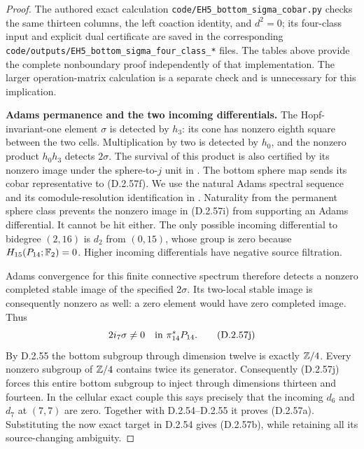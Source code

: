 \begin{proof}
The authored exact calculation
\texttt{code/EH5\_bottom\_sigma\_cobar.py} checks
the same thirteen columns, the left coaction identity,
and $d^2=0$; its four-class input and explicit dual
certificate are saved in the corresponding
\texttt{code/outputs/EH5\_bottom\_sigma\_four\_class\_*}
files.  The tables above provide the complete
nonboundary proof independently of that implementation.
The larger operation-matrix calculation is a separate
check and is unnecessary for this implication.

\medskip\noindent
\textbf{Adams permanence and the two incoming differentials.}
The Hopf-invariant-one element $\sigma$ is detected
by $h_3$: its cone has nonzero eighth square between
the two cells.  Multiplication by two is detected by
$h_0$, and the nonzero product $h_0h_3$ detects
$2\sigma$.  The survival of this product is also
certified by its nonzero image under the sphere-to-$j$
unit in \cite[Theorem 1.2 and Remark 1.3, p.~3]
{EH5BrunerRognes2022}.
The bottom sphere map sends its cobar representative to
\textup{(D.2.57f)}.  We use the natural Adams spectral
sequence and its comodule-resolution identification in
\cite[Part III, Theorem 15.1, pp.~370--371, and
pp.~372--377]{EH5Adams1974AHSS}.
Naturality from the permanent sphere class prevents
the nonzero image in \textup{(D.2.57i)} from supporting
an Adams differential.  It cannot be hit either.
The only possible incoming differential to bidegree
$(2,16)$ is $d_2$ from $(0,15)$, whose group is zero
because $H_{15}(P_{14};\mathbb F_2)=0$.
Higher incoming differentials have negative source
filtration.

Adams convergence for this finite connective spectrum
therefore detects a nonzero completed stable image
of the specified $2\sigma$.  Its two-local stable
image is consequently nonzero as well: a zero element
would have zero completed image.  Thus
\[
               2i_7\sigma\ne0\quad\hbox{in }\pi_{14}^sP_{14}.
               \tag{D.2.57j}
\]
By D.2.55 the bottom subgroup through dimension twelve
is exactly $\mathbb Z/4$.  Every nonzero subgroup of
$\mathbb Z/4$ contains twice its generator.  Consequently
\textup{(D.2.57j)} forces this entire bottom subgroup
to inject through dimensions thirteen and fourteen.
In the cellular exact couple this says precisely that
the incoming $d_6$ and $d_7$ at $(7,7)$ are zero.
Together with D.2.54--D.2.55 it proves
\textup{(D.2.57a)}.  Substituting the now exact target
in D.2.54 gives \textup{(D.2.57b)}, while retaining
all its source-changing ambiguity.
\end{proof}
